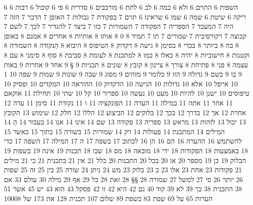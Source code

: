       6 השפות
      6 התוים
      6 ולא
      6 כמה
      6 לב
      6 לתת
      6 מורכבים
      6 סדרית
      6 פי
      6 קובול
      6 רבות
      6 ריקה
      6 שיטת
      6 שמה
      6 שמו
      6 שראינו
      6 תוים
      7 בפקודת
      7 גבולות
      7 האופן
      7 הדבר
      7 הזה
      7 היה
      7 המעבד
      7 הספריה
      7 הפקודה
      7 השמורות
      7 כזו
      7 כיצד
      7 להגדיר
      7 לכך
      7 לשם
      7 קבוצה
      7 רקורסיבית
      7 שמורים
      7 תו
      7 תמיד
      8 0
      8 אותו
      8 אותיות
      8 אחרים
      8 אמנם
      8 באופן
      8 בה
      8 ביותר
      8 בכדי
      8 בסימן
      8 גישה
      8 דקדוק
      8 הטיפוס
      8 היבוא
      8 הַנקודה
      8 השמורה
      8 וקטנות
      8 חישוביות
      8 יהיה
      8 כאלו
      8 כמו
      8 למתכנת
      8 לעומת
      8 סביבת
      8 סוף
      8 סימני
      8 עם
      8 עצמה
      8 פני
      8 פתיחת
      8 צורך
      8 ציינון
      8 קובץ
      8 שונים
      8 תכניות
      9 §
      9 אחד
      9 אחרות
      9 באות
      9 בו
      9 בשם
      9 גדולה
      9 הזו
      9 כלומר
      9 מזהים
      9 מסוג
      9 שבה
      9 שונות
      9 שמות
      9 שפה
     10 1
     10 אייפל
     10 אלא
     10 גדולות
     10 הגישה
     10 הדקדוק
     10 ההוראה
     10 המקדים
     10 ופסיק
     10 טיפוסים
     10 ישנן
     10 להיות
     10 מעט
     10 נעשה
     10 ספרור
     10 קל
     10 שתי
     10 תחילת
     11 אוקאם
     11 אחר
     11 אתה
     11 במילה
     11 הערה
     11 הפונקציה
     11 ו
     11 נקודת
     11 סימן
     11 עדה
     12 אחרת
     12 אך
     12 בדרך
     12 בכך
     12 בלוקים
     12 הביצוע
     12 הללו
     12 חלק
     12 שימוש
     13 הקובץ
     13 יכול
     13 לזהות
     13 מראש
     13 ספריה
     13 פקודה
     13 שם
     14 אינו
     14 אנו
     14 בעבור
     14 הַ
     14 המילים
     14 המתכנת
     14 פעולות
     14 רק
     14 שמורות
     15 בשורה
     15 בתוך
     15 כאשר
     15 להשתמש
     16 ההערה
     16 הם
     16 הן
     16 לכתוב
     17 בשפה
     17 ה
     17 המילה
     17 השפה
     17 כדי
     18 באמצעות
     18 הפקודות
     18 ידי
     18 מובאה
     18 מס
     18 שבו
     18 תכנות
     19 אינה
     19 בשפות
     19 הבלוק
     19 כן
     19 מספר
     20 או
     20 בכל
     20 התכנות
     20 כלל
     21 אין
     21 בתכנית
     21 כי
     21 מילים
     21 פקודות
     23 אחת
     23 אלו
     23 ב
     23 בלוק
     23 מש
     24 ניתן
     24 שורה
     25 בין
     25 זה
     25 שפות
     26 יותר
     26 סי
     27 למשל
     27 שמורה
     28 §§
     28 זאת
     28 כל
     29 אף
     29 מילה
     30 עולם
     33 אם
     38 התכנית
     38 כך
     39 לא
     39 קוד
     40 גם
     42 היא
     42 זו
     42 פסקל
     43 הוא
     43 יש
     45 אשר
     51 הערות
     65 על
     69 שפת
     83 בשפת
     89 שלום
    107 תכנית
    128 את
    173 של
  10008 
